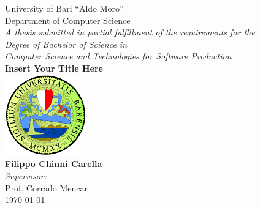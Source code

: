 \documentclass[12pt,twoside]{book}
\numberwithin{figure}{section}
\numberwithin{table}{section}
\numberwithin{equation}{section}
\begin{document}
\setcounter{secnumdepth}{3}
\setcounter{tocdepth}{3}


\frontmatter

\begin{titlepage}


\begin{center}
{\LARGE University of Bari ``Aldo Moro''}\\[0.25cm]
{\Large Department of Computer Science}\\[1cm]
{\large \emph{A thesis submitted in partial fulfillment of the requirements for the\\Degree of Bachelor of Science in\\[1cm]Computer Science and Technologies for Software Production}}\\[2.5cm]
\linespread{1.2}\huge {\bfseries Insert Your Title Here}\\[1.5cm]
\linespread{1}
\includegraphics[width=3.5cm]{images/uniba-logo.png}\\[1.5cm]
{\Large\bf Filippo Chinni Carella}\\[1cm]
\large \emph{Supervisor:}\\
Prof. Corrado Mencar\\[1cm] 
\vspace{\fill}
\today
\end{center}

\end{titlepage}


\end{document}
